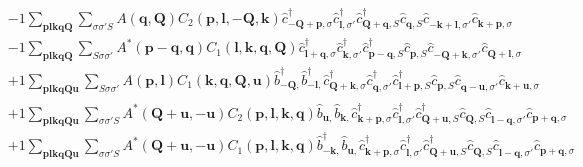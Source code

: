 \begin{align*}
	&-1 \sum_{ \mathbf{p} \mathbf{l} \mathbf{k} \mathbf{q} \mathbf{Q} } \sum_{ \sigma \sigma' S } A( \mathbf{q}, \mathbf{Q} )  C_2( \mathbf{p}, \mathbf{l}, -\mathbf{Q}, \mathbf{k} )   \hat{c}_{ -\mathbf{Q}+\mathbf{p}, \sigma }^\dagger  \hat{c}_{ \mathbf{l}, \sigma' }^\dagger  \hat{c}_{ \mathbf{Q}+\mathbf{q}, S }^\dagger  \hat{c}_{ \mathbf{q}, S }^{\phantom{\dagger}} \hat{c}_{ -\mathbf{k}+\mathbf{l}, \sigma' }^{\phantom{\dagger}} \hat{c}_{ \mathbf{k}+\mathbf{p}, \sigma }^{\phantom{\dagger}}  \\
	&-1 \sum_{ \mathbf{p} \mathbf{l} \mathbf{k} \mathbf{q} \mathbf{Q} } \sum_{ S \sigma \sigma' } A^*( \mathbf{p}-\mathbf{q}, \mathbf{q} )  C_1( \mathbf{l}, \mathbf{k}, \mathbf{q}, \mathbf{Q} )   \hat{c}_{ \mathbf{l}+\mathbf{q}, \sigma }^\dagger  \hat{c}_{ \mathbf{k}, \sigma' }^\dagger  \hat{c}_{ \mathbf{p}-\mathbf{q}, S }^\dagger  \hat{c}_{ \mathbf{p}, S }^{\phantom{\dagger}} \hat{c}_{ -\mathbf{Q}+\mathbf{k}, \sigma' }^{\phantom{\dagger}} \hat{c}_{ \mathbf{Q}+\mathbf{l}, \sigma }^{\phantom{\dagger}}  \\
	&+1 \sum_{ \mathbf{p} \mathbf{l} \mathbf{k} \mathbf{q} \mathbf{Q} \mathbf{u} } \sum_{ S \sigma \sigma' } A( \mathbf{p}, \mathbf{l} )  C_1( \mathbf{k}, \mathbf{q}, \mathbf{Q}, \mathbf{u} )   \hat{b}_{ -\mathbf{Q}, }^\dagger  \hat{b}_{ -\mathbf{l}, }^\dagger  \hat{c}_{ \mathbf{Q}+\mathbf{k}, \sigma }^\dagger  \hat{c}_{ \mathbf{q}, \sigma' }^\dagger  \hat{c}_{ \mathbf{l}+\mathbf{p}, S }^\dagger  \hat{c}_{ \mathbf{p}, S }^{\phantom{\dagger}} \hat{c}_{ \mathbf{q}-\mathbf{u}, \sigma' }^{\phantom{\dagger}} \hat{c}_{ \mathbf{k}+\mathbf{u}, \sigma }^{\phantom{\dagger}}  \\
	&+1 \sum_{ \mathbf{p} \mathbf{l} \mathbf{k} \mathbf{q} \mathbf{Q} \mathbf{u} } \sum_{ \sigma \sigma' S } A^*( \mathbf{Q}+\mathbf{u}, -\mathbf{u} )  C_2( \mathbf{p}, \mathbf{l}, \mathbf{k}, \mathbf{q} )   \hat{b}_{ \mathbf{u}, }^{\phantom{\dagger}} \hat{b}_{ \mathbf{k}, }^{\phantom{\dagger}} \hat{c}_{ \mathbf{k}+\mathbf{p}, \sigma }^\dagger  \hat{c}_{ \mathbf{l}, \sigma' }^\dagger  \hat{c}_{ \mathbf{Q}+\mathbf{u}, S }^\dagger  \hat{c}_{ \mathbf{Q}, S }^{\phantom{\dagger}} \hat{c}_{ \mathbf{l}-\mathbf{q}, \sigma' }^{\phantom{\dagger}} \hat{c}_{ \mathbf{p}+\mathbf{q}, \sigma }^{\phantom{\dagger}}  \\
	&+1 \sum_{ \mathbf{p} \mathbf{l} \mathbf{k} \mathbf{q} \mathbf{Q} \mathbf{u} } \sum_{ \sigma \sigma' S } A^*( \mathbf{Q}+\mathbf{u}, -\mathbf{u} )  C_1( \mathbf{p}, \mathbf{l}, \mathbf{k}, \mathbf{q} )   \hat{b}_{ -\mathbf{k}, }^\dagger  \hat{b}_{ \mathbf{u}, }^{\phantom{\dagger}} \hat{c}_{ \mathbf{k}+\mathbf{p}, \sigma }^\dagger  \hat{c}_{ \mathbf{l}, \sigma' }^\dagger  \hat{c}_{ \mathbf{Q}+\mathbf{u}, S }^\dagger  \hat{c}_{ \mathbf{Q}, S }^{\phantom{\dagger}} \hat{c}_{ \mathbf{l}-\mathbf{q}, \sigma' }^{\phantom{\dagger}} \hat{c}_{ \mathbf{p}+\mathbf{q}, \sigma }^{\phantom{\dagger}}  \\

\end{align*}
